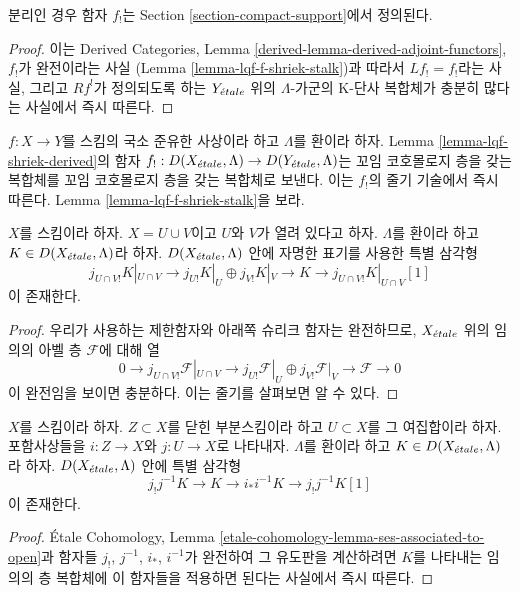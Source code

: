 \noindent
분리인 경우 함자 $f_!$는 Section \ref{section-compact-support}에서
정의된다.

\begin{proof}
이는 Derived Categories, Lemma
\ref{derived-lemma-derived-adjoint-functors}, $f_!$가 완전이라는 사실
(Lemma \ref{lemma-lqf-f-shriek-stalk})과 따라서 $Lf_! = f_!$라는
사실, 그리고 $Rf^!$가 정의되도록 하는 $Y_{\acute{e}tale}$ 위의
$\Lambda$-가군의 K-단사 복합체가 충분히 많다는 사실에서 즉시 따른다.
\end{proof}

\begin{remark}
\label{remark-lqf-shriek-derived-torsion}
$f : X \to Y$를 스킴의 국소 준유한 사상이라 하고 $\Lambda$를 환이라
하자. Lemma \ref{lemma-lqf-shriek-derived}의 함자
$f_! : D(X_{\acute{e}tale}, \Lambda) \to D(Y_{\acute{e}tale}, \Lambda)$는 꼬임
코호몰로지 층을 갖는 복합체를 꼬임 코호몰로지 층을 갖는 복합체로
보낸다. 이는 $f_!$의 줄기 기술에서 즉시 따른다. Lemma
\ref{lemma-lqf-f-shriek-stalk}을 보라.
\end{remark}

\begin{lemma}
\label{lemma-mayer-vietoris-shriek}
$X$를 스킴이라 하자. $X = U \cup V$이고 $U$와 $V$가 열려 있다고
하자. $\Lambda$를 환이라 하고 $K \in D(X_{\acute{e}tale}, \Lambda)$라 하자.
$D(X_{\acute{e}tale}, \Lambda)$ 안에 자명한 표기를 사용한 특별 삼각형
$$
j_{U \cap V!}K|_{U \cap V} \to
j_{U!}K|_U \oplus j_{V!}K|_V \to K \to 
j_{U \cap V!}K|_{U \cap V}[1]
$$
이 존재한다.
\end{lemma}

\begin{proof}
우리가 사용하는 제한함자와 아래쪽 슈리크 함자는 완전하므로,
$X_{\acute{e}tale}$ 위의 임의의 아벨 층 $\mathcal{F}$에 대해 열
$$
0 \to j_{U \cap V!}\mathcal{F}|_{U \cap V} \to
j_{U!}\mathcal{F}|_U \oplus j_{V!}\mathcal{F}|_V \to \mathcal{F} \to 0
$$
이 완전임을 보이면 충분하다. 이는 줄기를 살펴보면 알 수 있다.
\end{proof}

\begin{lemma}
\label{lemma-triangle-associated-to-open}
$X$를 스킴이라 하자. $Z \subset X$를 닫힌 부분스킴이라 하고
$U \subset X$를 그 여집합이라 하자. 포함사상들을
$i : Z \to X$와 $j : U \to X$로 나타내자. $\Lambda$를 환이라 하고
$K \in D(X_{\acute{e}tale}, \Lambda)$라 하자. $D(X_{\acute{e}tale}, \Lambda)$ 안에
특별 삼각형
$$
j_!j^{-1}K \to K \to i_*i^{-1}K \to j_!j^{-1}K[1]
$$
이 존재한다.
\end{lemma}

\begin{proof}
\'Etale Cohomology, Lemma
\ref{etale-cohomology-lemma-ses-associated-to-open}과 함자들
$j_!$, $j^{-1}$, $i_*$, $i^{-1}$가 완전하여 그 유도판을 계산하려면
$K$를 나타내는 임의의 층 복합체에 이 함자들을 적용하면 된다는
사실에서 즉시 따른다.
\end{proof}

